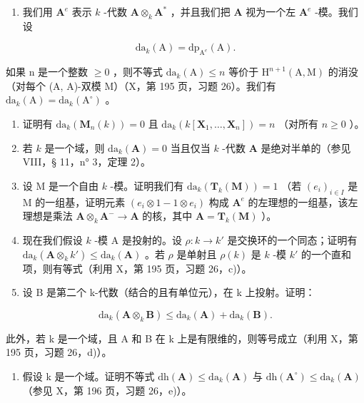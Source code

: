 \begin{enumerate}
\def\labelenumi{\arabic{enumi})}
\setcounter{enumi}{24}
\tightlist
\item
  我们用 \(\mathbf{A}^e\) 表示 \(k\) -代数 \(\mathbf{A} \otimes_k \mathbf{A}^*\) ，并且我们把 \(\mathbf{A}\) 视为一个左 \(\mathbf{A}^e\) -模。我们设
\end{enumerate}

\[
\mathrm{da} _ {k} (\mathrm{A}) = \mathrm{dp} _ {\mathrm{A} ^ {e}} (\mathrm{A}).
\]

如果 n 是一个整数 \(\geqslant0\) ，则不等式 \(\mathrm{da}_{k}(\mathrm{A})\leqslant n\) 等价于 \(\mathrm{H}^{n+1}(\mathrm{A},\mathrm{M})\) 的消没（对每个 (A, A)-双模 M）（X，第 195 页，习题 26）。我们有 \(\mathrm{da}_{k}(\mathrm{A})=\mathrm{da}_{k}(\mathrm{A}^{\circ})\) 。

\begin{enumerate}
\def\labelenumi{\alph{enumi})}
\item
  证明有 \(\mathrm{da}_k(\mathbf{M}_n(k)) = 0\) 且 \(\mathrm{da}_k(k[\mathbf{X}_1, \ldots, \mathbf{X}_n]) = n\) （对所有 \(n \geqslant 0\) ）。
\item
  若 \(k\) 是一个域，则 \(\mathrm{da}_{k}(\mathbf{A}) = 0\) 当且仅当 \(k\) -代数 \(\mathbf{A}\) 是绝对半单的（参见 VIII，§ 11，n° 3，定理 2）。
\item
  设 M 是一个自由 \(k\) -模。证明我们有 \(\mathrm{da}_{k}(\mathbf{T}_{k}(\mathbf{M})) = 1\) （若 \((e_{i})_{i \in I}\) 是 M 的一组基，证明元素 \((e_{i} \otimes 1 - 1 \otimes e_{i})\) 构成 \(\mathbf{A}^{e}\) 的左理想的一组基，该左理想是乘法 \(\mathbf{A} \otimes_{k} \mathbf{A}^{-} \to \mathbf{A}\) 的核，其中 \(\mathbf{A} = \mathbf{T}_{k}(\mathbf{M})\) ）。
\item
  现在我们假设 \(k\) -模 A 是投射的。设 \(\rho: k \to k'\) 是交换环的一个同态；证明有 \(\mathrm{da}_k(\mathbf{A} \otimes_k k') \leqslant \mathrm{da}_k(\mathbf{A})\) 。若 \(\rho\) 是单射且 \(\rho(k)\) 是 \(k\) -模 \(k'\) 的一个直和项，则有等式（利用 X，第 195 页，习题 26，c)）。
\item
  设 B 是第二个 k-代数（结合的且有单位元），在 k 上投射。证明：
\end{enumerate}

\[
\mathrm{da} _ {k} (\mathbf {A} \otimes_ {k} \mathbf {B}) \leqslant \mathrm{da} _ {k} (\mathbf {A}) + \mathrm{da} _ {k} (\mathbf {B}).
\]

此外，若 k 是一个域，且 A 和 B 在 k 上是有限维的，则等号成立（利用 X，第 195 页，习题 26，d)）。

\begin{enumerate}
\def\labelenumi{\alph{enumi})}
\setcounter{enumi}{5}
\tightlist
\item
  假设 k 是一个域。证明不等式 \(\mathrm{dh}(\mathbf{A}) \leqslant \mathrm{da}_{k}(\mathbf{A})\) 与 \(\mathrm{dh}(\mathbf{A}^{\circ}) \leqslant \mathrm{da}_{k}(\mathbf{A})\) （参见 X，第 196 页，习题 26，e)）。
\end{enumerate}

